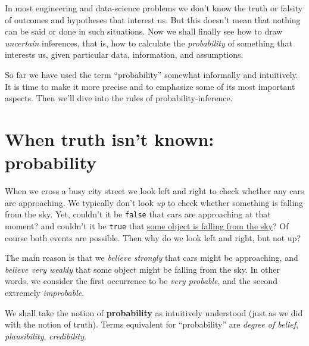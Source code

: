 \documentclass[
  a4paper,
  DIV=11,
  numbers=noendperiod,
  oneside]{scrreprt}
\begin{document}
\providecommand*{\mo}[1][=]{\mathord{\,#1\,}}
\providecommand*{\yX}{\se{X}}
\providecommand*{\yY}{\se{Y}}
\providecommand*{\yI}{\se{I}}
\providecommand{\di}{\mathrm{d}}

\providecommand*{\ys}{\se{s}}
\providecommand*{\yh}{\se{h}}
\providecommand*{\yf}{\se{f}}
\providecommand*{\yJ}{\se{J}}
\providecommand*{\yZ}{\se{Z}}
\providecommand*{\yH}{\se{H}}

In most engineering and data-science problems we don't know the truth or
falsity of outcomes and hypotheses that interest us. But this doesn't
mean that nothing can be said or done in such situations. Now we shall
finally see how to draw \emph{uncertain} inferences, that is, how to
calculate the \emph{probability} of something that interests us, given
particular data, information, and assumptions.

So far we have used the term ``probability'' somewhat informally and
intuitively. It is time to make it more precise and to emphasize some of
its most important aspects. Then we'll dive into the rules of
probability-inference.

\hypertarget{sec-probability-def}{%
\section{When truth isn't known:
probability}\label{sec-probability-def}}

When we cross a busy city street we look left and right to check whether
any cars are approaching. We typically don't look \emph{up} to check
whether something is falling from the sky. Yet, couldn't it be
\texttt{false} that cars are approaching at that moment? and couldn't it
be \texttt{true} that
\href{https://www.aerotime.aero/articles/32818-cessna-door-falls-off-lands-in-parking-lot}{some
object is falling from the sky}? Of course both events are possible.
Then why do we look left and right, but not up?

The main reason is that we \emph{believe strongly} that cars might be
approaching, and \emph{believe very weakly} that some object might be
falling from the sky. In other words, we consider the first occurrence
to be \emph{very probable}, and the second extremely \emph{improbable}.

We shall take the notion of {\textbf{probability}} as intuitively
understood (just as we did with the notion of truth). Terms equivalent
for ``probability'' are {\emph{degree of belief}},
{\emph{plausibility}}, {\emph{credibility}}.
\end{document}
